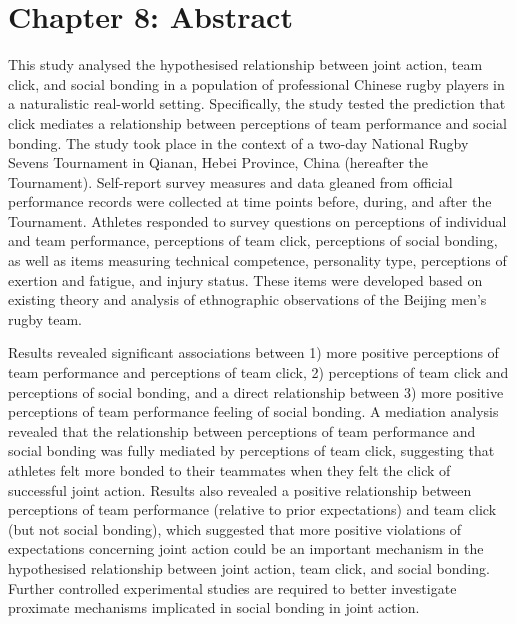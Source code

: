 
\chapter*{Chapter 8: Abstract}



This study analysed the hypothesised relationship between joint action, team click, and social bonding in a population of professional Chinese rugby players in a naturalistic real-world setting.  Specifically, the study tested the prediction that click mediates a relationship between perceptions of team performance and social bonding.  The study took place in the context of a two-day National Rugby Sevens Tournament in Qianan, Hebei Province, China (hereafter the Tournament).  Self-report survey measures and data gleaned from official performance records were collected at time points before, during, and after the Tournament.  Athletes responded to survey questions on perceptions of individual and team performance, perceptions of team click, perceptions of social bonding, as well as items measuring technical competence, personality type, perceptions of exertion and fatigue, and injury status. These items were developed based on existing theory and analysis of ethnographic observations of the Beijing men's rugby team.


Results revealed significant associations between 1) more positive perceptions of team performance and perceptions of team click, 2) perceptions of team click and perceptions of social bonding, and a direct relationship between 3) more positive perceptions of team performance feeling of social bonding.  A mediation analysis revealed that the relationship between perceptions of team performance and social bonding was fully mediated by perceptions of team click,  suggesting that athletes felt more bonded to their teammates when they felt the click of successful joint action. Results also revealed a positive relationship between perceptions of team performance (relative to prior expectations) and team click (but not social bonding), which suggested that more positive violations of expectations concerning joint action could be an important mechanism in the hypothesised relationship between joint action, team click, and social bonding.  Further controlled experimental studies are required to better investigate proximate mechanisms implicated in social bonding in joint action.


